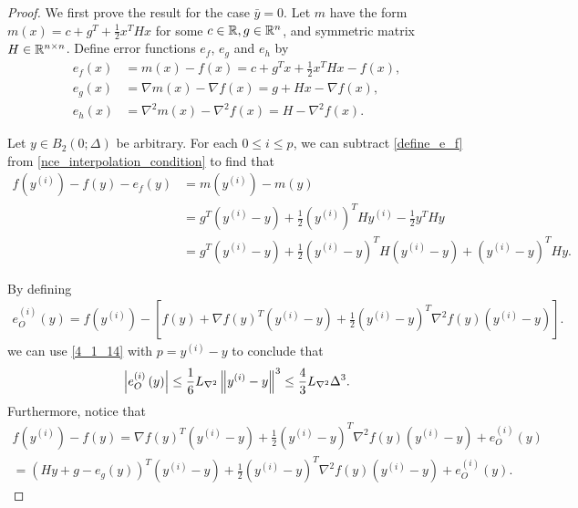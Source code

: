 \documentclass{article}
\begin{document}
\begin{proof}
We first prove the result for the case $\bar{y}=0$.  
Let $m$ have the form $m(x) = c + g^T + \frac 1 2 x^T H x$ for some 
$c \in \mathbb R, g \in \mathbb R^n$,  and symmetric matrix $H \in \mathbb R^{n \times n}$. 
Define error functions $e_f$, $e_g$ and $e_h$ by
\begin{align}
e_f(x) & = m(x)-f(x) = c + g^T x + \frac 1 2 x^T H x - f(x) \label{define_e_f}, \\
e_g(x) &= \nabla m(x)-\nabla f(x) = g + H x - \nabla f(x), \nonumber \\
e_h(x) &= \nabla^2 m(x)-\nabla^2 f(x) = H -\nabla^2 f(x). \nonumber
\end{align}

Let $y \in B_2(0; \Delta)$ be arbitrary.
For each $0 \le i \le p$, we can subtract \cref{define_e_f} from \cref{nce_interpolation_condition} to find that
\begin{align}
f\left(y^{(i)}\right) - f(y) - e_f(y)
&= m\left(y^{(i)}\right) - m(y) \nonumber \\
&= g^T\left(y^{(i)}-y\right)+\frac{1}{2}\left(y^{(i)}\right)^T H y^{(i)}-
\frac{1}{2} y^T H y\\
&=g^T  \left(y^{(i)} - y\right)  + \frac 1 2 \left(y^{(i)} - y\right)^T H \left(y^{(i)} - y\right) + \left(y^{(i)} - y\right)^T H y. \label{nec_eqn2}
\end{align}

By defining
\begin{align*}
e^{(i)}_O(y) = 
f\left(y^{(i)}\right) - \left[f(y) + \nabla f(y)^T \left(y^{(i)} - y\right) + \frac 1 2 \left(y^{(i)} - y\right)^T \nabla^2 f(y) \left(y^{(i)} - y\right)\right].
\end{align*}
we can use \cref{4_1_14} with  $p = y^{(i)} - y$ to conclude that
\begin{align}
\left|e^{(i)}_O\left(y\right) \right| \le \frac 1 6 {L_{\nabla^2}} \left\|y^{(i)} - y\right\|^3 \le \frac 4 3 {L_{\nabla^2}} \Delta^3 \label{nce_bound_rhs}.
\end{align}
Furthermore, notice that
\begin{align*}
f\left(y^{(i)}\right) - f(y)
= \nabla f(y)^T \left(y^{(i)} - y\right) + \frac 1 2 \left(y^{(i)} - y\right)^T \nabla^2 f(y) \left(y^{(i)} - y\right) + e^{(i)}_O\left(y\right) \\
= \left(Hy + g - e_g(y)\right)^T  \left(y^{(i)} - y\right) + \frac 1 2 \left(y^{(i)} - y\right)^T \nabla^2 f(y) \left(y^{(i)} - y\right) + e^{(i)}_O\left(y\right).
\end{align*}


\end{proof}
\end{document}
